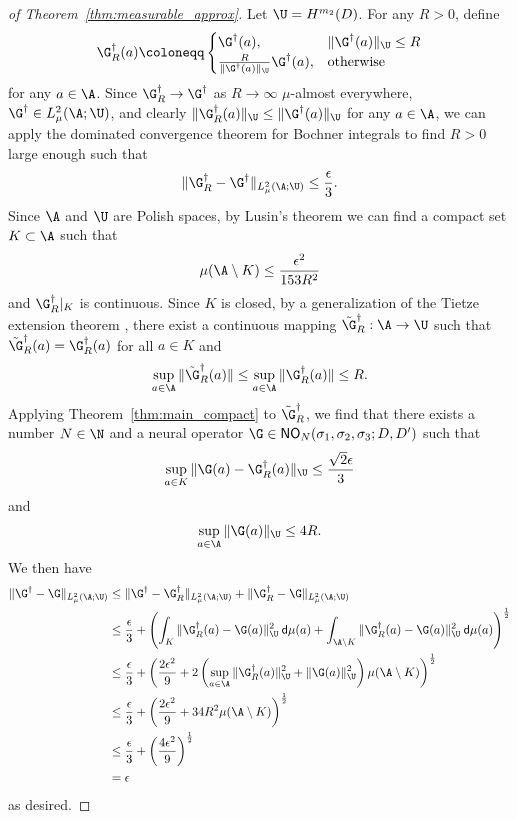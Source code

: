 \begin{proof}[of Theorem~\ref{thm:measurable_approx}]
Let \(\U = H^{m_2}(D)\). For any \(R > 0\), define 
\[\G^\dagger_R (a) \coloneqq \begin{cases}
\G^\dagger(a), & \|\G^\dagger(a)\|_{\U} \leq R \\
\frac{R}{\|\G^\dagger(a)\|_{\U}} \G^\dagger(a), & \text{otherwise}
\end{cases}\]
for any \(a \in \A\). Since \(\G^\dagger_R \to \G^\dagger\) as \(R \to \infty\) \(\mu\)-almost everywhere, \(\G^\dagger \in L^2_\mu(\A;\U)\), and clearly \(\|\G^\dagger_R(a)\|_{\U} \leq \|\G^\dagger (a)\|_{\U}\) for any \(a \in \A\), we can apply the dominated convergence theorem for Bochner integrals to find \(R > 0\) large enough such that
\[\|\G^\dagger_R - \G^\dagger\|_{L^2_\mu (\A;\U)} \leq \frac{\epsilon}{3}.\]
Since \(\A\) and \(\U\) are Polish spaces, by Lusin's theorem \cite[Theorem 1.0.0]{aaronson1997introduction} we can find a compact set \(K \subset \A\) such that
\[\mu(\A \setminus K) \leq \frac{\epsilon^2}{153R^2}\]
and \(\G^\dagger_R |_K\) is continuous. Since \(K\) is closed, by a generalization of the Tietze extension theorem \cite[Theorem 4.1]{dugundji1961anextension},
there exist a continuous mapping \(\tilde{\G}^\dagger_R : \A \to \U \) such that \(\tilde{\G}^\dagger_R(a) = \G^\dagger_R(a)\) for 
all \(a \in K\) and 
\[\sup_{a \in \A} \|\tilde{\G}^\dagger_R(a)\| \leq \sup_{a \in \A} \|\G^\dagger_R(a)\| \leq R.\]
Applying Theorem~\ref{thm:main_compact} to \(\tilde{\G}^\dagger_R\), we find that there exists a number \(N \in \N\) and a neural operator \(\G \in \mathsf{NO}_{N}(\sigma_1,\sigma_2,\sigma_3;D,D')\)
such that
\[\sup_{a \in K} \|\G(a) - \G^\dagger_R(a) \|_\U \leq \frac{\sqrt{2} \epsilon}{3}\]
and
\[\sup_{a \in \A} \|\G(a)\|_{\U} \leq 4R.\]
We then have
\begin{align*}
\|\G^\dagger - \G\|_{L^2_\mu(\A;\U)} &\leq \|\G^\dagger - \G^\dagger_R\|_{L^2_\mu (\A;\U)} + \|\G^\dagger_R - \G\|_{L^2_\mu (\A;\U)} \\
&\leq \frac{\epsilon}{3} + \left ( \int_K \|\G^\dagger_R(a) - \G(a)\|^2_\U \: \mathsf{d}\mu (a) + \int_{\A \setminus K} \|\G^\dagger_R(a) - \G(a)\|^2_\U \: \mathsf{d}\mu (a) \right )^{\frac{1}{2}} \\
&\leq \frac{\epsilon}{3} + \left (\frac{2 \epsilon^2}{9} + 2 \left ( \sup_{a \in \A} \|\G^\dagger_R (a)\|_\U^2 +  \|\G (a)\|_\U^2 \right ) \mu(\A \setminus K) \right )^{\frac{1}{2}} \\
&\leq \frac{\epsilon}{3} + \left (\frac{2 \epsilon^2}{9} + 34 R^2 \mu(\A \setminus K) \right )^{\frac{1}{2}} \\
&\leq\frac{\epsilon}{3} + \left (\frac{4 \epsilon^2}{9}\right )^{\frac{1}{2}} \\
&= \epsilon
\end{align*}
as desired.
\end{proof}


